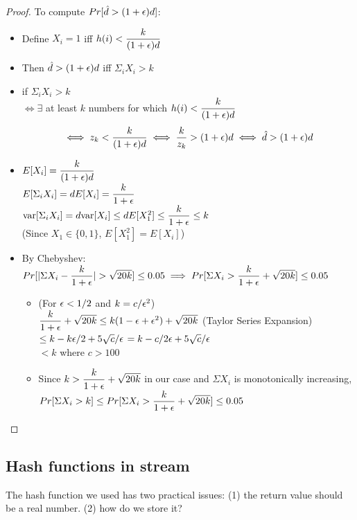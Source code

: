 \documentclass[11pt]{article}
\def\eps{\ensuremath\epsilon}
\begin{document}
\begin{proof}
To compute $Pr[\hat{d} > (1+\eps)d]$:
\begin{itemize}
\item Define $X_{i} = 1$ iff $h(i) < \dfrac{k}{(1+\eps)d}$
\item Then $\hat{d} > (1+\eps)d$ iff $\Sigma_{i} X_{i} > k$
\item if $\Sigma_{i} X_{i} > k$\\
  $\iff \exists$ at least $k$ numbers for which $h(i) < \dfrac{k}{(1+\eps)d}$\\
    \begin{equation}
      \iff z_{k} < \dfrac{k}{(1+\eps)d}
      \iff \dfrac{k}{z_{k}} > (1+\eps)d
      \iff \hat{d} > (1+\eps)d
    \end{equation}
\item
  $E[X_{i}] = \dfrac{k}{(1+\eps)d}$\\
  $E[\Sigma_{i} X_{i}] = d E[X_{i}] = \dfrac{k}{1 + \eps}$\\
  $\text{var}[\Sigma_{i} X_{i}] = d \text{var}[X_{i}] \leq dE[X_{1}^{2}] \leq  \dfrac{k}{1+\eps} \leq k$\\
  (Since $X_{1} \in \{0,1\}$, $E[X_{1}^{2}] = E[X_{i}]$)
\item By Chebyshev:
    $Pr[|\Sigma X_{i} - \dfrac{k}{1+\eps}| > \sqrt{20k}] \leq 0.05 \implies Pr[\Sigma X_{i} > \dfrac{k}{1+\eps} + \sqrt{20k}] \leq 0.05 $\\
    \begin{itemize}
    \item
      (For $\eps < 1/2$ and $k=c/\eps^{2}$)\\
      $\dfrac{k}{1+\eps} + \sqrt{20k} \leq k(1-\eps+\eps^{2}) + \sqrt{20k}$ (Taylor Series Expansion)\\
      $ \leq k - k\eps/2 + 5\sqrt{c}/\eps$
      $ = k - c / 2\eps + 5\sqrt{c}/\eps$\\
      $ < k $ where $c > 100$
    \item
      Since $k > \dfrac{k}{1+\eps} + \sqrt{20k} $ in our case and $\Sigma X_{i}$ is monotonically increasing, $Pr[\Sigma X_{i} > k] \leq Pr[\Sigma X_{i} > \dfrac{k}{1+\eps} + \sqrt{20k}] \leq 0.05$

    \end{itemize}
\end{itemize}
\end{proof}

\subsection{Hash functions in stream}
The hash function we used has two practical issues: (1) the return value should be a real number. (2) how do we store it?
\end{document}
